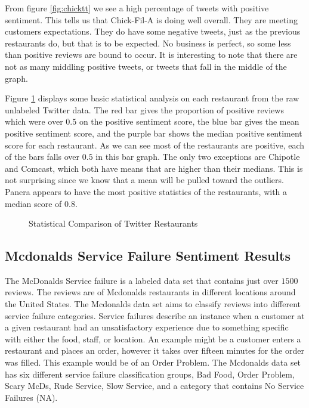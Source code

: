 \documentclass[titlepage,letterpaper]{article}
\begin{document}
From figure \cref{fig:chicktt} we see a high percentage of tweets with positive sentiment. This tells us that Chick-Fil-A is doing well overall. They are meeting customers expectations. They do have some negative tweets, just as the previous restaurants do, but that is to be expected. No business is perfect, so some less than positive reviews are bound to occur. It is interesting to note that there are not as many middling positive tweets, or tweets that fall in the middle of the graph.

Figure \ref{compstat} displays some basic statistical analysis on each restaurant from the raw unlabeled Twitter data. The red bar gives the proportion of positive reviews which were over $0.5$ on the positive sentiment score, the blue bar gives the mean positive sentiment score, and the purple bar shows the median positive sentiment score for each restaurant. As we can see most of the restaurants are positive, each of the bars falls over $0.5$ in this bar graph. The only two exceptions are Chipotle and Comcast, which both have means that are higher than their medians. This is not surprising since we know that a mean will be pulled toward the outliers. Panera appears to have the most positive statistics of the restaurants, with a median score of $0.8$. 

\begin{figure}[]
	\centering
	\caption{Statistical Comparison of Twitter Restaurants}
	
	\label{compstat}
\end{figure}


\subsection{Mcdonalds Service Failure Sentiment Results}

The McDonalds Service failure is a labeled data set that contains just over $1500$ reviews. The reviews are of Mcdonalds restaurants in different locations around the United States. The Mcdonalds data set aims to classify reviews into different service failure categories. Service failures describe an instance when a customer at a given restaurant had an unsatisfactory experience due to something specific with either the food, staff, or location. An example might be a customer enters a restaurant and places an order, however it takes over fifteen minutes for the order was filled. This example would be of an Order Problem. The Mcdonalds data set has six different service failure classification groups, Bad Food, Order Problem, Scary McDs, Rude Service, Slow Service, and a category that contains No Service Failures (NA). 
\end{document}
